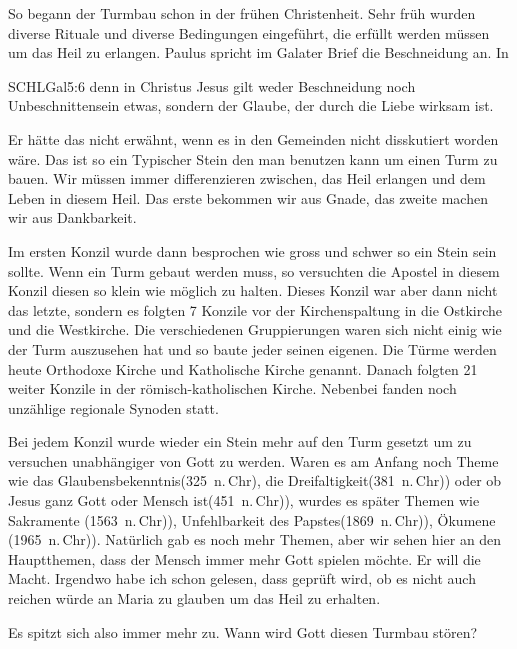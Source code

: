 \documentclass[14pt]{../../inc/mybib}
\newenvironment{block}[1][]{%
  \vspace{1.5em}%
  \noindent\textbf{#1}\par%
  \vspace{0.0em}%
}{%
  \vspace{1em}%
}
\begin{document}
\begin{block}
    So begann der Turmbau schon in der frühen Christenheit. Sehr früh wurden diverse Rituale und diverse Bedingungen eingeführt, die erfüllt werden müssen um das Heil zu erlangen. 
    Paulus spricht im Galater Brief die Beschneidung an. In 
    \begin{bibelbox}{SCHL}{Gal}{5:6}
        denn in Christus Jesus gilt weder Beschneidung noch Unbeschnittensein etwas, sondern der Glaube, der durch die Liebe wirksam ist.
    \end{bibelbox}
    Er hätte das nicht erwähnt, wenn es in den Gemeinden nicht disskutiert worden wäre. Das ist so ein Typischer Stein den man benutzen kann um einen Turm zu bauen. Wir müssen immer differenzieren zwischen, das Heil erlangen und dem Leben in diesem Heil. Das erste bekommen wir aus Gnade, das zweite machen wir aus Dankbarkeit.

    Im ersten Konzil wurde dann besprochen wie gross und schwer so ein Stein sein sollte. Wenn ein Turm gebaut werden muss, so versuchten die Apostel in diesem Konzil diesen so klein wie möglich zu halten. Dieses Konzil war aber dann nicht das letzte, sondern es folgten 7 Konzile vor der Kirchenspaltung in die Ostkirche und die Westkirche. Die verschiedenen Gruppierungen waren sich nicht einig wie der Turm auszusehen hat und so baute jeder seinen eigenen. Die Türme werden heute Orthodoxe Kirche und Katholische Kirche genannt. Danach folgten 21 weiter Konzile in der römisch-katholischen Kirche. Nebenbei fanden noch unzählige regionale Synoden statt.
    
    Bei jedem Konzil wurde wieder ein Stein mehr auf den Turm gesetzt um zu versuchen unabhängiger von Gott zu werden. Waren es am Anfang noch Theme wie das Glaubensbekenntnis(325~n.\,Chr), die Dreifaltigkeit(381~n.\,Chr)) oder ob Jesus ganz Gott oder Mensch ist(451~n.\,Chr)), wurdes es später Themen wie Sakramente (1563~n.\,Chr)), Unfehlbarkeit des Papstes(1869~n.\,Chr)), Ökumene (1965~n.\,Chr)). Natürlich gab es noch mehr Themen, aber wir sehen hier an den Hauptthemen, dass der Mensch immer mehr Gott spielen möchte. Er will die Macht.
    Irgendwo habe ich schon gelesen, dass geprüft wird, ob es nicht auch reichen würde an Maria zu glauben um das Heil zu erhalten.
    
    Es spitzt sich also immer mehr zu. Wann wird Gott diesen Turmbau stören?
\end{block}
\end{document}
